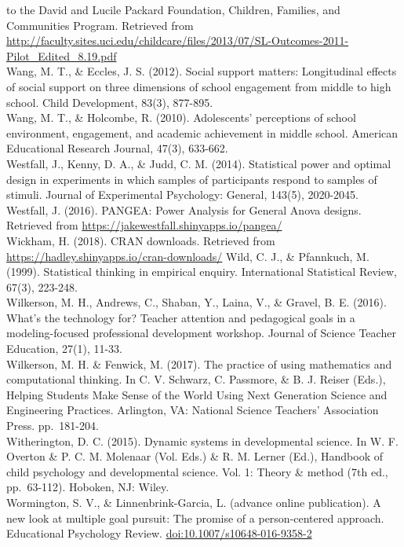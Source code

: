 \documentclass[]{book}
\theoremstyle{definition}
\theoremstyle{definition}
\theoremstyle{definition}
\theoremstyle{remark}
\begin{document}
to the David and Lucile Packard Foundation, Children, Families, and
Communities Program. Retrieved from
\url{http://faculty.sites.uci.edu/childcare/files/2013/07/SL-Outcomes-2011-Pilot_Edited_8.19.pdf}\\
Wang, M. T., \& Eccles, J. S. (2012). Social support matters:
Longitudinal effects of social support on three dimensions of school
engagement from middle to high school. Child Development, 83(3),
877-895.\\
Wang, M. T., \& Holcombe, R. (2010). Adolescents' perceptions of school
environment, engagement, and academic achievement in middle school.
American Educational Research Journal, 47(3), 633-662.\\
Westfall, J., Kenny, D. A., \& Judd, C. M. (2014). Statistical power and
optimal design in experiments in which samples of participants respond
to samples of stimuli. Journal of Experimental Psychology: General,
143(5), 2020-2045.\\
Westfall, J. (2016). PANGEA: Power Analysis for General Anova designs.
Retrieved from \url{https://jakewestfall.shinyapps.io/pangea/}\\
Wickham, H. (2018). CRAN downloads. Retrieved from
\url{https://hadley.shinyapps.io/cran-downloads/} Wild, C. J., \&
Pfannkuch, M. (1999). Statistical thinking in empirical enquiry.
International Statistical Review, 67(3), 223-248.\\
Wilkerson, M. H., Andrews, C., Shaban, Y., Laina, V., \& Gravel, B. E.
(2016). What's the technology for? Teacher attention and pedagogical
goals in a modeling-focused professional development workshop. Journal
of Science Teacher Education, 27(1), 11-33.\\
Wilkerson, M. H. \& Fenwick, M. (2017). The practice of using
mathematics and computational thinking. In C. V. Schwarz, C. Passmore,
\& B. J. Reiser (Eds.), Helping Students Make Sense of the World Using
Next Generation Science and Engineering Practices. Arlington, VA:
National Science Teachers' Association Press. pp.~181-204.\\
Witherington, D. C. (2015). Dynamic systems in developmental science. In
W. F. Overton \& P. C. M. Molenaar (Vol. Eds.) \& R. M. Lerner (Ed.),
Handbook of child psychology and developmental science. Vol. 1: Theory
\& method (7th ed., pp.~63-112). Hoboken, NJ: Wiley.\\
Wormington, S. V., \& Linnenbrink-Garcia, L. (advance online
publication). A new look at multiple goal pursuit: The promise of a
person-centered approach. Educational Psychology Review.
\url{doi:10.1007/s10648-016-9358-2}
\end{document}
